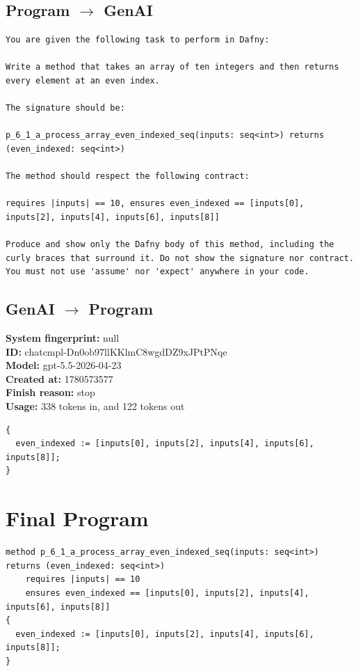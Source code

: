 \documentclass{article}
\begin{document}
\subsection*{Program $\rightarrow$ GenAI}
\begin{lstlisting}
You are given the following task to perform in Dafny:

Write a method that takes an array of ten integers and then returns every element at an even index.

The signature should be:

p_6_1_a_process_array_even_indexed_seq(inputs: seq<int>) returns (even_indexed: seq<int>)

The method should respect the following contract:

requires |inputs| == 10, ensures even_indexed == [inputs[0], inputs[2], inputs[4], inputs[6], inputs[8]]

Produce and show only the Dafny body of this method, including the curly braces that surround it. Do not show the signature nor contract. You must not use 'assume' nor 'expect' anywhere in your code.
\end{lstlisting}
\subsection*{GenAI $\rightarrow$ Program}
\textbf{System fingerprint: }null
\\\textbf{ID: }chatcmpl-Dn0ob97llKKlmC8wgdDZ9xJPtPNqe
\\\textbf{Model: }gpt-5.5-2026-04-23
\\\textbf{Created at: }1780573577
\\\textbf{Finish reason: }stop
\\\textbf{Usage: }338 tokens in, and 122 tokens out
\begin{lstlisting}
{
  even_indexed := [inputs[0], inputs[2], inputs[4], inputs[6], inputs[8]];
}
\end{lstlisting}
\section*{Final Program}
\begin{lstlisting}
method p_6_1_a_process_array_even_indexed_seq(inputs: seq<int>) returns (even_indexed: seq<int>)
	requires |inputs| == 10
	ensures even_indexed == [inputs[0], inputs[2], inputs[4], inputs[6], inputs[8]]
{
  even_indexed := [inputs[0], inputs[2], inputs[4], inputs[6], inputs[8]];
}
\end{lstlisting}
\end{document}
